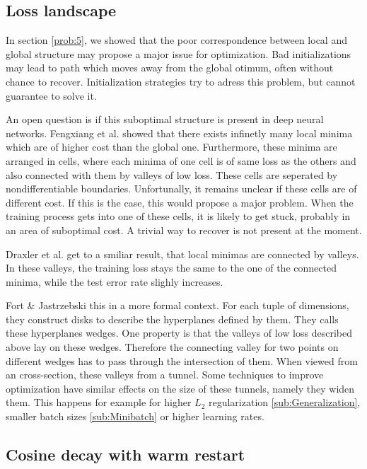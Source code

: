 \subsection{Loss landscape}\label{loss_landscape}
In section \ref{prob:5}, we showed that the poor correspondence between local
and global structure may propose a major issue for optimization. Bad
initializations may lead to path which moves away from the global otimum, often
without chance to recover. Initialization strategies try to adress this problem,
but cannot guarantee to solve it.

An open question is if this suboptimal structure is present in deep neural
networks. Fengxiang et al. \cite{he2020piecewise} showed that there exists
infinetly many local minima which are of higher cost than the global one.
Furthermore, these minima are arranged in cells, where each minima of one cell
is of same loss as the others and also connected with them by valleys of low
loss. These cells are seperated by nondifferentiable boundaries. Unfortunally,
it remains unclear if these cells are of different cost. If this is the case,
this would propose a major problem. When the training process gets into one of
these cells, it is likely to get stuck, probably in an area of suboptimal cost.
A trivial way to recover is not present at the moment.

Draxler et al. \cite{draxler2018essentially} get to a smiliar result, that local
minimas are connected by valleys. In these valleys, the training loss stays the
same to the one of the connected minima, while the test error rate slighly
increases.

Fort \& Jastrzebski \cite{fort2019large}  this in a more formal context. For
each tuple of dimensions, they construct disks to describe the hyperplanes
defined by them. They calls these hyperplanes wedges. One property is that the
valleys of low loss described above lay on these wedges. Therefore the
connecting valley for two points on different wedges has to pass through the
intersection of them. When viewed from an cross-section, these valleys from a
tunnel. Some techniques to improve optimization have similar effects on the size
of these tunnels, namely they widen them. This happens for example for higher
$L_2$ regularization \ref{sub:Generalization}, smaller batch sizes
\ref{sub:Minibatch} or higher learning rates.


\subsection{Cosine decay with warm restart}\label{sub:cosine_decay}


